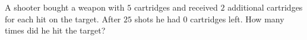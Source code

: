 A shooter bought a weapon with $5$ cartridges and received $2$ additional cartridges for each hit on the target. After $25$ shots he had $0$ cartridges left. How many times did he hit the target?
